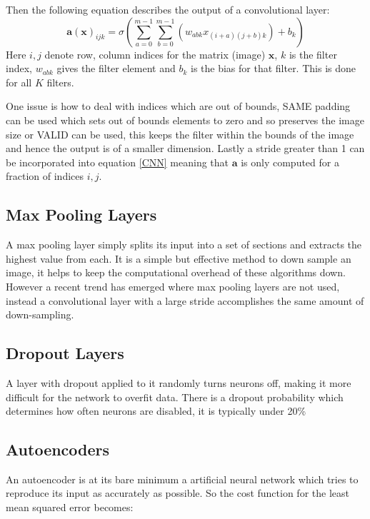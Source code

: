 \documentclass[11pt,twoside]{report}
\begin{document}
Then the following equation describes the output of a convolutional layer:
\begin{equation} \label{CNN}
    \mathbf{a}(\mathbf{x})_{ijk} = \sigma \left ( \sum_{a=0}^{m-1}\sum_{b=0}^{m-1}(w_{abk}x_{(i+a)(j+b)k}) + b_k \right )
\end{equation}
Here $i,j$  denote row, column indices for the matrix (image) $\mathbf{x}$, $k$ is the filter index, $w_{abk}$
gives the filter element and $b_k$ is the bias for that filter. This is done for all $K$ filters.

One issue is how to deal with indices which are out of bounds, SAME padding can be used which sets out of bounds
elements to zero and so preserves the image size or VALID can be used, this keeps the filter within the bounds of the
image and hence the output is of a smaller dimension. Lastly a stride greater than 1 can be incorporated into equation
\ref{CNN} meaning that $\mathbf{a}$ is only computed for a fraction of indices $i,j$.
\subsection{Max Pooling Layers}
A max pooling layer simply splits its input into a set of sections and extracts
the highest value from each. It is a simple but effective method to down sample
an image, it helps to keep the computational overhead of these algorithms
down. However a recent trend \cite{Springenberg2015} has emerged where max pooling
layers are not used, instead a convolutional layer with a large stride accomplishes
the same amount of down-sampling.
\subsection{Dropout Layers}
A layer with dropout applied to it randomly turns neurons off, making it more
difficult for the network to overfit data. There is a dropout probability
which determines how often neurons are disabled, it is typically under 20\%
\subsection{Autoencoders}
An autoencoder is at its bare minimum a artificial neural network which tries
to reproduce its input as accurately as possible. So the cost function for the
least mean squared error becomes:
\end{document}

